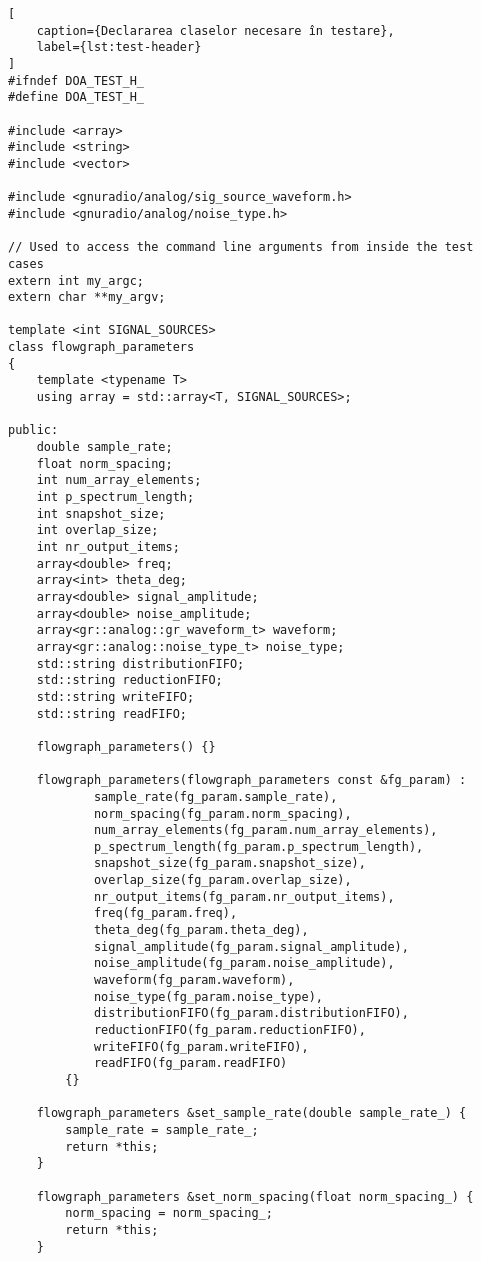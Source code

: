 \begin{lstlisting}[
    caption={Declararea claselor necesare în testare},
    label={lst:test-header}
]
#ifndef DOA_TEST_H_
#define DOA_TEST_H_

#include <array>
#include <string>
#include <vector>

#include <gnuradio/analog/sig_source_waveform.h>
#include <gnuradio/analog/noise_type.h>

// Used to access the command line arguments from inside the test cases
extern int my_argc;
extern char **my_argv;

template <int SIGNAL_SOURCES>
class flowgraph_parameters
{
    template <typename T>
    using array = std::array<T, SIGNAL_SOURCES>;

public:
    double sample_rate;
    float norm_spacing;
    int num_array_elements;
    int p_spectrum_length;
    int snapshot_size;
    int overlap_size;
    int nr_output_items;
    array<double> freq;
    array<int> theta_deg;
    array<double> signal_amplitude;
    array<double> noise_amplitude;
    array<gr::analog::gr_waveform_t> waveform;
    array<gr::analog::noise_type_t> noise_type;
    std::string distributionFIFO;
    std::string reductionFIFO;
    std::string writeFIFO;
    std::string readFIFO;

    flowgraph_parameters() {}

    flowgraph_parameters(flowgraph_parameters const &fg_param) :
            sample_rate(fg_param.sample_rate),
            norm_spacing(fg_param.norm_spacing),
            num_array_elements(fg_param.num_array_elements),
            p_spectrum_length(fg_param.p_spectrum_length),
            snapshot_size(fg_param.snapshot_size),
            overlap_size(fg_param.overlap_size),
            nr_output_items(fg_param.nr_output_items),
            freq(fg_param.freq),
            theta_deg(fg_param.theta_deg),
            signal_amplitude(fg_param.signal_amplitude),
            noise_amplitude(fg_param.noise_amplitude),
            waveform(fg_param.waveform),
            noise_type(fg_param.noise_type),
            distributionFIFO(fg_param.distributionFIFO),
            reductionFIFO(fg_param.reductionFIFO),
            writeFIFO(fg_param.writeFIFO),
            readFIFO(fg_param.readFIFO)
        {}

    flowgraph_parameters &set_sample_rate(double sample_rate_) {
        sample_rate = sample_rate_;
        return *this;
    }

    flowgraph_parameters &set_norm_spacing(float norm_spacing_) {
        norm_spacing = norm_spacing_;
        return *this;
    }


\end{lstlisting}
